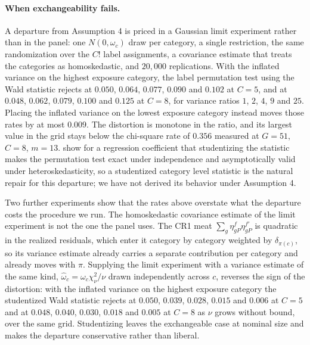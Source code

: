 \documentclass[12pt]{article}
\theoremstyle{definition}
\numberwithin{equation}{section}
\begin{document}
\paragraph{When exchangeability fails.} A departure from Assumption
4 is priced in a Gaussian limit experiment rather than in the panel:
one $N(0,\omega_c)$ draw per category, a single restriction, the same
randomization over the $C!$ label assignments, a covariance estimate that
treats the categories as homoskedastic, and $20{,}000$ replications. With the
inflated variance on the highest exposure category, the label permutation test
using the Wald statistic rejects at $0.050$, $0.064$, $0.077$, $0.090$ and
$0.102$ at $C = 5$, and at $0.048$, $0.062$, $0.079$, $0.100$ and $0.125$ at
$C = 8$, for variance ratios $1$, $2$, $4$, $9$ and $25$. Placing the inflated
variance on the lowest exposure category instead moves those rates by at most
$0.009$. The distortion is monotone in the ratio, and its largest value in the
grid stays below the chi-square rate of $0.356$ measured at $G = 51$, $C = 8$,
$m = 13$. \citet{diciccio2017robust} show for a regression coefficient that
studentizing the statistic makes the permutation test exact under
independence and asymptotically valid under heteroskedasticity, so a
studentized category level statistic is the natural repair for this
departure; we have not derived its behavior under Assumption 4.

Two further experiments show that the rates above overstate what the departure
costs the procedure we run. The homoskedastic covariance estimate of the limit
experiment is not the one the panel uses. The CR1 meat
$\sum_g \eta^f_{gP}\eta^{f\prime}_{gP}$ is quadratic in the realized residuals,
which enter it category by category weighted by $\delta_{\pi(c)}$, so its
variance estimate already carries a separate contribution per category and
already moves with $\pi$. Supplying the limit experiment with a variance
estimate of the same kind, $\hat{\omega}_c = \omega_c \chi^2_\nu/\nu$ drawn
independently across $c$, reverses the sign of the distortion: with the
inflated variance on the highest exposure category the studentized Wald
statistic rejects at $0.050$, $0.039$, $0.028$, $0.015$ and $0.006$ at $C = 5$
and at $0.048$, $0.040$, $0.030$, $0.018$ and $0.005$ at $C = 8$ as $\nu$ grows
without bound, over the same grid. Studentizing leaves the exchangeable case at
nominal size and makes the departure conservative rather than liberal.
\end{document}
